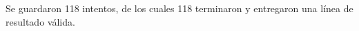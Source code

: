 Se guardaron 118 intentos, de los cuales 118 terminaron y entregaron una línea de resultado válida.
